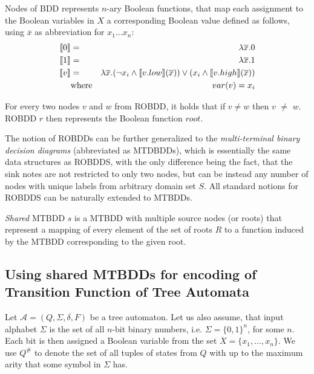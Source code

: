 Nodes of BDD represents $n$-ary Boolean functions, that map each assignment to the Boolean variables in $X$ a corresponding Boolean value defined as follows, using $\overline{x}$ as abbreviation for $x_1\ldots x_n$:
\begin{eqnarray*}
 \text{\textlbrackdbl} 0\text{\textrbrackdbl} & = & \lambda\overline{x}.0\\
 \text{\textlbrackdbl} 1\text{\textrbrackdbl} & = & \lambda\overline{x}.1\\
 \text{\textlbrackdbl} v\text{\textrbrackdbl} & = & \lambda\overline{x}.(\neg x_i \wedge \text{\textlbrackdbl} v.low\text{\textrbrackdbl}(\overline{x})) \vee (x_i \wedge \text{\textlbrackdbl} v.high\text{\textrbrackdbl}(\overline{x}))\\
       & \text{where} & var(v) = x_i
\end{eqnarray*}

For every two nodes $v$ and $w$ from ROBDD, it holds that if $v \neq w$ then \textlbrackdbl $v$ \textrbrackdbl$ \neq$ \textlbrackdbl $w$\textrbrackdbl. ROBDD $r$ then represents the Boolean function \textlbrackdbl $root$\textrbrackdbl.

The notion of ROBDDs can be further generalized to the \emph{multi-terminal binary decision diagrams} (abbreviated as MTDBDDs), which is essentially the same data structures as ROBDDS, with the only difference being the fact, that the sink notes are not restricted to only two nodes, but can be instead any number of nodes with unique labels from arbitrary domain set $S$. All standard notions for ROBDDS can be naturally extended to MTBDDs.

\emph{Shared} MTBDD $s$ is a MTBDD with multiple source nodes (or roots) that represent a mapping of every element of the set of roots $R$ to a function induced by the MTBDD corresponding to the given root.

\subsection[Usage of MTBDDs with TA]{Using shared MTBDDs for encoding of Transition Function of Tree Automata}
Let $\mathcal{A} = (Q, \Sigma, \delta, F)$ be a tree automaton. Let us also assume, that input alphabet $\Sigma$ is the set of all $n$-bit binary numbers, i.e. $\Sigma = \{0,1\}^n$, for some $n$. Each bit is then assigned a Boolean variable from the set $X = \{x_1,\ldots,x_n\}$. We use $Q^\#$ to denote the set of all tuples of states from $Q$ with up to the maximum arity that some symbol in $\Sigma$ has.

